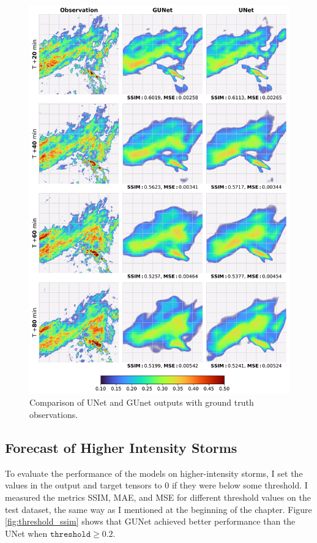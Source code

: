 \begin{figure}[H]
    \centering
    \includegraphics[width=\textwidth]{images/comparison_square_06.png}
    \caption[Comparison of weather predictions of both models (1)]{\label{fig:comparison_06}Comparison of UNet and GUnet outputs with ground truth observations.}
\end{figure}

\subsection{Forecast of Higher Intensity Storms}
\label{sec:forecast_higher_intensity}

To evaluate the performance of the models on higher-intensity storms, I set the values in the output and target tensors to 0 if they were below some threshold. I measured the metrics \gls{SSIM}, \gls{MAE}, and \gls{MSE} for different threshold values on the test dataset, the same way as I mentioned at the beginning of the chapter. Figure \ref{fig:threshold_ssim} shows that \gls{GUNet} achieved better performance than the UNet when $\texttt{threshold} \geq 0.2$.

